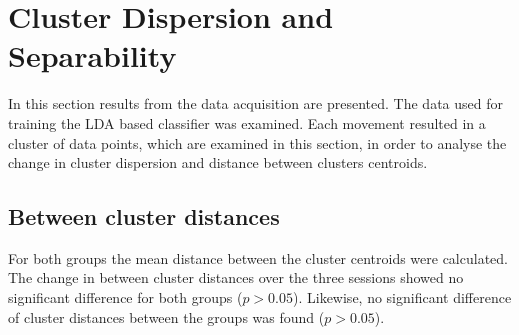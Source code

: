 \section{Cluster Dispersion and Separability}
In this section results from the data acquisition are presented. The data used for training the LDA based classifier was examined. Each movement resulted in a cluster of data points, which are examined in this section, in order to analyse the change in cluster dispersion and distance between clusters centroids.


\subsection{Between cluster distances}
For both groups the mean distance between the cluster centroids were calculated. The change in between cluster distances over the three sessions showed no significant difference for both groups ($p > 0.05$). Likewise, no significant difference of cluster distances between the groups was found ($p > 0.05$).\\


